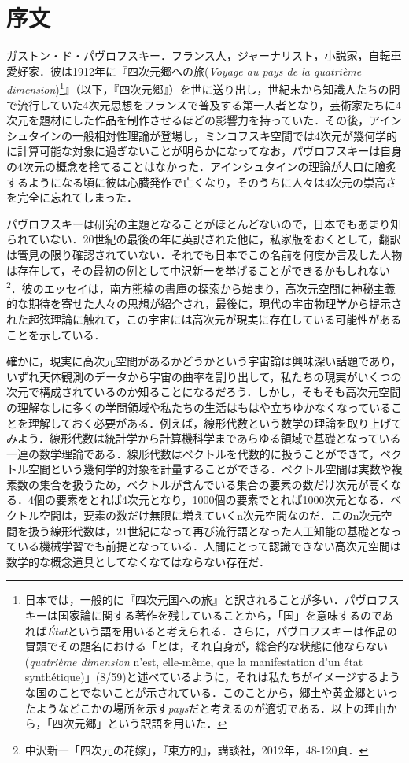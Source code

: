 \chapter{序文}
ガストン・ド・パヴロフスキー．フランス人，ジャーナリスト，小説家，自転車愛好家．彼は1912年に『四次元郷への旅(\emph{Voyage au pays de la quatrième dimension})\footnote{日本では，一般的に『四次元国への旅』と訳されることが多い．パヴロフスキーは国家論に関する著作を残していることから，「国」を意味するのであれば\emph{État}という語を用いると考えられる．さらに，パヴロフスキーは作品の冒頭でその題名における「とは，それ自身が，総合的な状態に他ならない(\emph{quatrième dimension} n'est, elle-même, que la manifestation d'un état synthétique)」(8/59)と述べているように，それは私たちがイメージするような国のことでないことが示されている．このことから，郷土や黄金郷といったようなどこかの場所を示す\emph{pays}だと考えるのが適切である．以上の理由から，「四次元郷」という訳語を用いた．}』（以下，『四次元郷』）を世に送り出し，世紀末から知識人たちの間で流行していた4次元思想をフランスで普及する第一人者となり，芸術家たちに4次元を題材にした作品を制作させるほどの影響力を持っていた．その後，アインシュタインの一般相対性理論が登場し，ミンコフスキ空間では4次元が幾何学的に計算可能な対象に過ぎないことが明らかになってなお，パヴロフスキーは自身の4次元の概念を捨てることはなかった．アインシュタインの理論が人口に膾炙するようになる頃に彼は心臓発作で亡くなり，そのうちに人々は4次元の崇高さを完全に忘れてしまった．

パヴロフスキーは研究の主題となることがほとんどないので，日本でもあまり知られていない．20世紀の最後の年に英訳された他に，私家版をおくとして，翻訳は管見の限り確認されていない．それでも日本でこの名前を何度か言及した人物は存在して，その最初の例として中沢新一を挙げることができるかもしれない\footnote{中沢新一「四次元の花嫁」，『東方的』，講談社，2012年，48-120頁．}．彼のエッセイは，南方熊楠の書庫の探索から始まり，高次元空間に神秘主義的な期待を寄せた人々の思想が紹介され，最後に，現代の宇宙物理学から提示された超弦理論に触れて，この宇宙には高次元が現実に存在している可能性があることを示している．

確かに，現実に高次元空間があるかどうかという宇宙論は興味深い話題であり，いずれ天体観測のデータから宇宙の曲率を割り出して，私たちの現実がいくつの次元で構成されているのか知ることになるだろう．しかし，そもそも高次元空間の理解なしに多くの学問領域や私たちの生活はもはや立ちゆかなくなっていることを理解しておく必要がある．例えば，線形代数という数学の理論を取り上げてみよう．線形代数は統計学から計算機科学まであらゆる領域で基礎となっている一連の数学理論である．線形代数はベクトルを代数的に扱うことができて，ベクトル空間という幾何学的対象を計量することができる．ベクトル空間は実数や複素数の集合を扱うため，ベクトルが含んでいる集合の要素の数だけ次元が高くなる．4個の要素をとれば4次元となり，1000個の要素でとれば1000次元となる．ベクトル空間は，要素の数だけ無限に増えていくn次元空間なのだ．このn次元空間を扱う線形代数は，21世紀になって再び流行語となった人工知能の基礎となっている機械学習でも前提となっている．人間にとって認識できない高次元空間は数学的な概念道具としてなくなてはならない存在だ．

